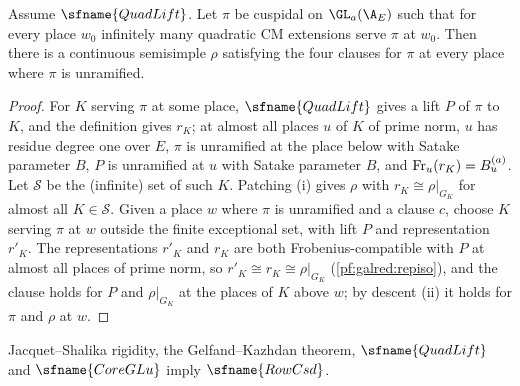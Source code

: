 \begin{lemma}\label{pf:galred:stepdown}
Assume $\sfname{QuadLift}$. Let $\pi$ be cuspidal on $\GL_a(\A_E)$ such that for every place $w_0$ infinitely many quadratic CM
extensions serve $\pi$ at $w_0$. Then there is a continuous semisimple $\rho$ satisfying the four clauses for $\pi$ at every
place where $\pi$ is unramified.
\end{lemma}

\begin{proof}
For $K$ serving $\pi$ at some place, $\sfname{QuadLift}$ gives a lift $P$ of $\pi$ to $K$, and the definition gives $r_K$; at
almost all places $u$ of $K$ of prime norm, $u$ has residue degree one over $E$, $\pi$ is unramified at the place below with
Satake parameter $B$, $P$ is unramified at $u$ with Satake parameter $B$, and $\operatorname{Fr}_u(r_K)=B^{(a)}_u$. Let $\mathcal S$ be
the (infinite) set of such $K$. Patching (i) gives $\rho$ with $r_K\cong\rho|_{G_K}$ for almost all $K\in\mathcal S$. Given a place
$w$ where $\pi$ is unramified and a clause $c$, choose $K$ serving $\pi$ at $w$ outside the finite exceptional set, with lift
$P$ and representation $r'_K$. The representations $r'_K$ and $r_K$ are both Frobenius-compatible with $P$ at almost all
places of prime norm, so $r'_K\cong r_K\cong\rho|_{G_K}$ (\cref{pf:galred:repiso}), and the clause holds for $P$ and
$\rho|_{G_K}$ at the places of $K$ above $w$; by descent (ii) it holds for $\pi$ and $\rho$ at $w$.
\end{proof}

\begin{theorem}\label{pf:galred:joinUp}
Jacquet--Shalika rigidity, the Gelfand--Kazhdan theorem, $\sfname{QuadLift}$ and $\sfname{CoreGLu}$ imply
$\sfname{RowCsd}$.
\end{theorem}

